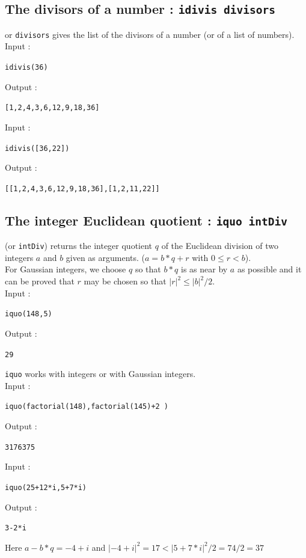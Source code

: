 \documentclass[a4paper,11pt]{book}
\begin{document}
\subsection{The divisors of a number : {\tt idivis divisors}} 
 or {\tt divisors} gives the list of the divisors of a 
number (or of a list of numbers).\\
Input :
\begin{center}{\tt idivis(36) }\end{center}
Output :
\begin{center}{\tt  [1,2,4,3,6,12,9,18,36] }\end{center}
Input :
\begin{center}{\tt idivis([36,22]) }\end{center}
Output :
\begin{center}{\tt [[1,2,4,3,6,12,9,18,36],[1,2,11,22]]}\end{center}

\subsection{The integer Euclidean quotient : {\tt iquo intDiv}}
 (or {\tt intDiv})  returns the integer quotient  $q$ of the
Euclidean division of two integers $a$ and $b$ given as arguments. 
($a=b*q+r$ with $0\leq r< b$).\\ 
For Gaussian integers, we choose $q$ so that $b*q$ is as near by $a$ as 
possible and it can be proved that $r$ may be chosen so that 
$|r|^2 \leq |b|^2/2$.\\
Input :
\begin{center}{\tt iquo(148,5) }\end{center}
Output :
\begin{center}{\tt 29}\end{center}
{\tt iquo} works with integers or with Gaussian integers.\\
Input :
\begin{center}{\tt iquo(factorial(148),factorial(145)+2 )}\end{center}
Output :
\begin{center}{\tt 3176375}\end{center}
Input :
\begin{center}{\tt iquo(25+12*i,5+7*i) }\end{center}
Output :
\begin{center}{\tt 3-2*i}\end{center}
Here $a-b*q=-4+i$ and $|-4+i|^2=17<|5+7*i|^2/2=74/2=37$
\end{document}

